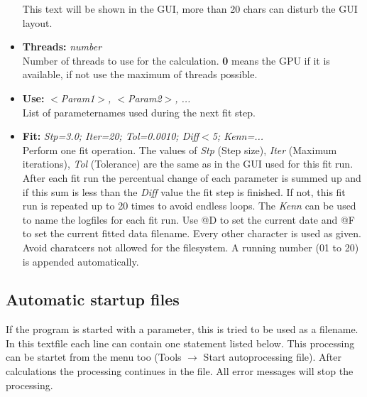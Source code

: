 \documentclass[11pt]{article} %
\begin{document}
\begin{itemize}
	This text will be shown in the GUI, more than 20 chars can disturb the GUI layout.
\item {\bf Threads:} {\it number} \\
	Number of threads to use for the calculation. {\bf 0} means the GPU if it is available, if not use the maximum of threads possible.
\item {\bf Use:} {\it $<$Param1$>$, $<$Param2$>$, ... } \\
	List of parameternames used during the next fit step.
\item {\bf Fit:} {\it Stp=3.0; Iter=20; Tol=0.0010; Diff$<$5; Kenn=...} \\
	Perform one fit operation. The values of {\it Stp} (Step size), {\it Iter} (Maximum iterations), {\it Tol} (Tolerance) are the same as in the GUI used for this fit run. After each fit run the percentual change of each parameter is summed up and if this sum is less than the {\it Diff} value the fit step is finished. If not, this fit run is repeated up to 20 times to avoid endless loops. The {\it Kenn} can be used to name the logfiles for each fit run. Use @D to set the current date and @F to set the current fitted data filename. Every other character is used as given. Avoid charatcers not allowed for the filesystem. A running number (01 to 20) is appended automatically.
\end{itemize}


\clearpage
\subsection{Automatic startup files}

If the program is started with a parameter, this is tried to be used as a filename. In this textfile each line can contain one statement listed below.
This processing can be startet from the menu too (Tools $\rightarrow$ Start autoprocessing file).
After calculations the processing continues in the file. All error messages will stop the processing.
\end{document}
